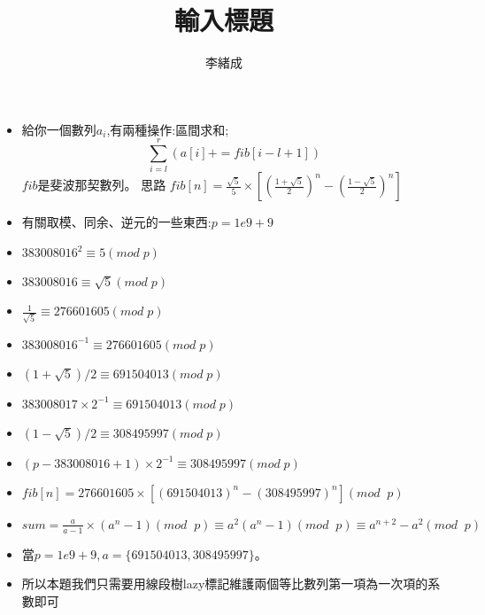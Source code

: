 \documentclass[a4paper, 12pt]{article}
\title{輸入標題}
\author{李緒成}
\begin{document}
    \begin{itemize}
        \item 給你一個數列$a_i$,有兩種操作:區間求和;
        $$\sum_{i=l}^{r}(a[i]+=fib[i-l+1])$$\(fib\)是斐波那契數列。
        思路
        \(fib[n] = \frac{\sqrt5}{5}\times [(\frac{1+\sqrt5}{2})^n-(\frac{1-\sqrt5}{2})^n]\)
        
        \item 有關取模、同余、逆元的一些東西:\(p = 1e9 + 9\)
        \item \(383008016^2 \equiv 5 (mod\;p)\)
        \item \(383008016 \equiv \sqrt5 (mod\;p)\)
        \item \(\frac{1}{\sqrt5} \equiv 276601605(mod\;p)\)
        \item \(383008016^{-1} \equiv 276601605(mod\;p)\)
        \item \((1+\sqrt5)/2 \equiv 691504013(mod\;p)\)
        \item \(383008017\times 2^{-1} \equiv 691504013(mod\;p)\)
        \item \((1-\sqrt5)/2 \equiv 308495997(mod\;p)\)
        \item \((p-383008016+1)\times 2^{-1} \equiv 308495997(mod\;p)\)
        
        \item \(fib[n] = 276601605\times [(691504013)^n-(308495997)^n] (mod\;\;p)\)
        \item \(sum = \frac{a}{a-1} \times (a^n - 1) (mod\;\;p) \equiv a^2(a^n-1)(mod\;\;p)\equiv a^{n+2}-a^2(mod\;\;p)\)
        \item 當\(p=1e9+9, a = \{691504013, 308495997\}\)。
        \item 所以本題我們只需要用線段樹lazy標記維護兩個等比數列第一項為一次項的系數即可
    \end{itemize}
\end{document}
